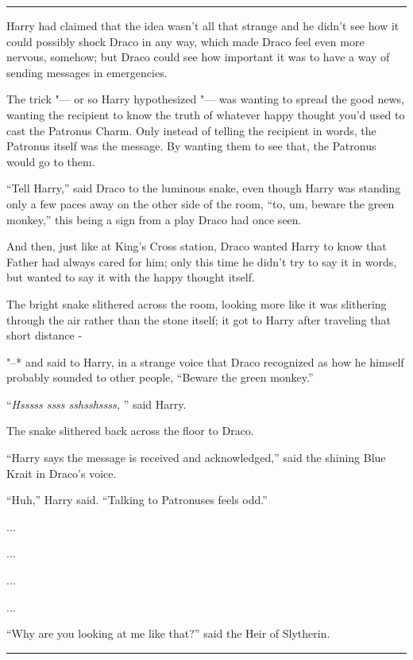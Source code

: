 \begin{center}\rule{3in}{0.4pt}\end{center}

Harry had claimed that the idea wasn't all that strange and he didn't
see how it could possibly shock Draco in any way, which made Draco feel
even more nervous, somehow; but Draco could see how important it was to
have a way of sending messages in emergencies.

The trick "--- or so Harry hypothesized "--- was wanting to spread the good
news, wanting the recipient to know the truth of whatever happy thought
you'd used to cast the Patronus Charm. Only instead of telling the
recipient in words, the Patronus itself was the message. By wanting them
to see that, the Patronus would go to them.

``Tell Harry,'' said Draco to the luminous snake, even though Harry was
standing only a few paces away on the other side of the room, ``to, um,
beware the green monkey,'' this being a sign from a play Draco had once
seen.

And then, just like at King's Cross station, Draco wanted Harry to know
that Father had always cared for him; only this time he didn't try to
say it in words, but wanted to say it with the happy thought itself.

The bright snake slithered across the room, looking more like it was
slithering through the air rather than the stone itself; it got to Harry
after traveling that short distance -

"--* and said to Harry, in a strange voice that Draco recognized as how he
himself probably sounded to other people, ``Beware the green monkey.''

``\emph{Hsssss ssss sshsshssss,} '' said Harry.

The snake slithered back across the floor to Draco.

``Harry says the message is received and acknowledged,'' said the
shining Blue Krait in Draco's voice.

``Huh,'' Harry said. ``Talking to Patronuses feels odd.''

...

...

...

...

``Why are you looking at me like that?'' said the Heir of Slytherin.

\begin{center}\rule{3in}{0.4pt}\end{center}

